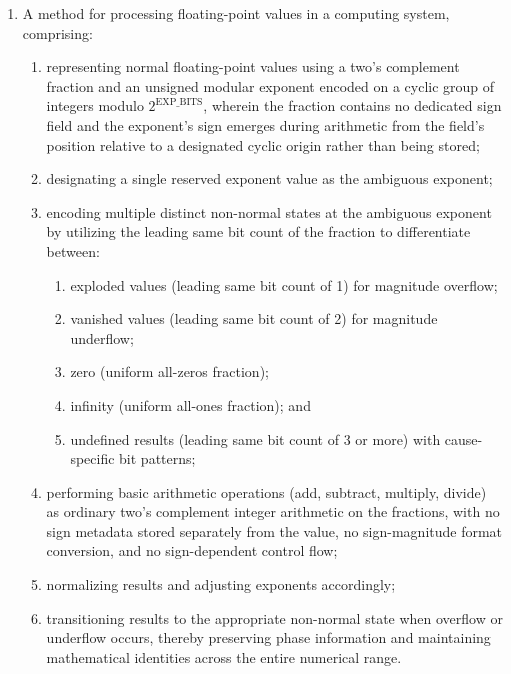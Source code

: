 \documentclass[12pt,letter]{article}
\begin{document}
\begin{enumerate}
          \item\label{cl:scalar-method} A method for processing floating-point values in a computing system, comprising:
          \begin{enumerate}
              \item representing normal floating-point values using a two's complement fraction and an unsigned modular exponent encoded on a cyclic group of integers modulo $2^{\text{EXP\_BITS}}$, wherein the fraction contains no dedicated sign field and the exponent's sign emerges during arithmetic from the field's position relative to a designated cyclic origin rather than being stored;
              \item designating a single reserved exponent value as the ambiguous exponent;
              \item encoding multiple distinct non-normal states at the ambiguous exponent by utilizing the leading same bit count of the fraction to differentiate between:
                    \begin{enumerate}
                        \item exploded values (leading same bit count of 1) for magnitude overflow;
                        \item vanished values (leading same bit count of 2) for magnitude underflow;
                        \item zero (uniform all-zeros fraction);
                        \item infinity (uniform all-ones fraction); and
                        \item undefined results (leading same bit count of 3 or more) with cause-specific bit patterns;
                    \end{enumerate}
              \item performing basic arithmetic operations (add, subtract, multiply, divide) as ordinary two's complement integer arithmetic on the fractions, with no sign metadata stored separately from the value, no sign-magnitude format conversion, and no sign-dependent control flow;
              \item normalizing results and adjusting exponents accordingly;
              \item transitioning results to the appropriate non-normal state when overflow or underflow occurs, thereby preserving phase information and maintaining mathematical identities across the entire numerical range.
          \end{enumerate}


\end{enumerate}
\end{document}
